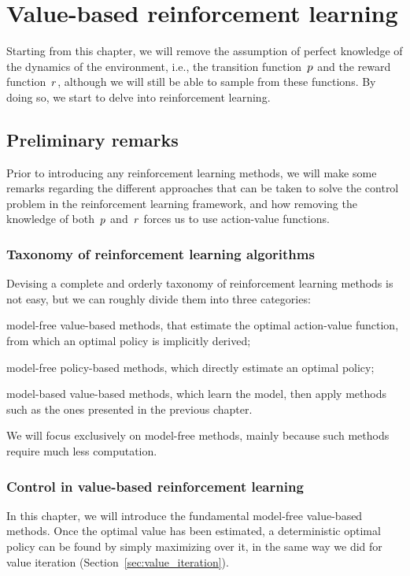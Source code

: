 \chapter{Value-based reinforcement learning} \label{ch:value_based_rl}
Starting from this chapter, we will remove the assumption of perfect knowledge of the dynamics of the environment, i.e., the transition function~${p}$ and the reward function~${r}$, although we will still be able to sample from these functions. By doing so, we start to delve into reinforcement learning.

\section{Preliminary remarks}
Prior to introducing any reinforcement learning methods, we will make some remarks regarding the different approaches that can be taken to solve the control problem in the reinforcement learning framework, and how removing the knowledge of both~${p}$ and~${r}$ forces us to use action-value functions.

\subsection{Taxonomy of reinforcement learning algorithms}
Devising a complete and orderly taxonomy of reinforcement learning methods is not easy, but we can roughly divide them into three categories:
\begin{enumerate*}[label=\arabic*)]
	\item model-free value-based methods, that estimate the optimal action-value function, from which an optimal policy is implicitly derived;
	\item model-free policy-based methods, which directly estimate an optimal policy;
	\item model-based value-based methods, which learn the model, then apply methods such as the ones presented in the previous chapter.
\end{enumerate*}

We will focus exclusively on model-free methods, mainly because such methods require much less computation.

\subsection{Control in value-based reinforcement learning}
In this chapter, we will introduce the fundamental model-free value-based methods. Once the optimal value has been estimated, a deterministic optimal policy can be found by simply maximizing over it, in the same way we did for value iteration (Section~\ref{sec:value_iteration}).

